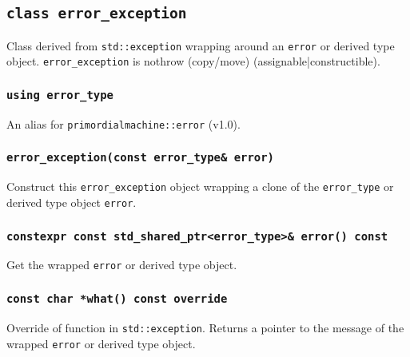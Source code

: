 \documentclass[oneside]{article}
\begin{document}
\subsection{\texttt{class error\_exception}}
Class derived from \texttt{std::exception} wrapping around an \texttt{error} or derived type
object. \texttt{error\_exception} is nothrow (copy/move) (assignable|constructible).

\subsubsection{\texttt{using error\_type}}
An alias for \lstinline{primordialmachine::error} (v1.0).

\subsubsection{\texttt{error\_exception(const error\_type\& error)}}
Construct this \texttt{error\_exception} object wrapping a clone of the \texttt{error\_type} or
derived type object \texttt{error}.

\subsubsection{\texttt{constexpr const std\_shared\_ptr\textless{}error\_type\textgreater{}\& error() const}}
Get the wrapped \texttt{error} or derived type object.

\subsubsection{\texttt{const char *what() const override}}
Override of function in \texttt{std::exception}.
Returns a pointer to the message of the wrapped \texttt{error} or derived type object.
\end{document}
